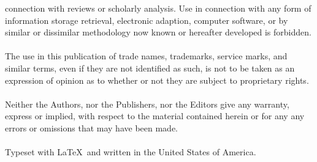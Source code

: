 \begin{titlepage}
connection with reviews or scholarly analysis.  Use in connection with any form of information storage retrieval, 
electronic adaption, computer software, or by similar or dissimilar methodology now known or hereafter developed is forbidden. \\ \\ 
The use in this publication of trade names, trademarks, service marks, and similar terms, even if they are not identified as 
such, is not to be taken as an expression of opinion as to whether or not they are subject to proprietary rights. \\ \\ 
Neither the Authors, nor the Publishers, nor the Editors give any warranty, express or implied, with respect to the material 
contained herein or for any any errors or omissions that may have been made.  \\ \\  
Typeset with \LaTeX \, and written in the United States of America.  
\\[2pt] \HRule \\[0.5cm]  \authname \\ \cred \\ \website
\end{titlepage}


